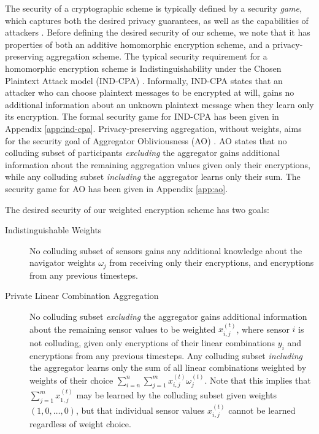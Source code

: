 \documentclass[twocolumn]{autart}
\theoremstyle{definition}
\begin{document}
The security of a cryptographic scheme is typically defined by a security \textit{game}, which captures both the desired privacy guarantees, as well as the capabilities of attackers \cite{katzIntroductionModernCryptography2008}. Before defining the desired security of our scheme, we note that it has properties of both an additive homomorphic encryption scheme, and a privacy-preserving aggregation scheme. The typical security requirement for a homomorphic encryption scheme is Indistinguishability under the Chosen Plaintext Attack model (IND-CPA) \cite{}. Informally, IND-CPA states that an attacker who can choose plaintext messages to be encrypted at will, gains no additional information about an unknown plaintext message when they learn only its encryption. The formal security game for IND-CPA has been given in Appendix \ref{app:ind-cpa}. Privacy-preserving aggregation, without weights, aims for the security goal of Aggregator Obliviousness (AO) \cite{}. AO states that no colluding subset of participants \textit{excluding} the aggregator gains additional information about the remaining aggregation values given only their encryptions, while any colluding subset \textit{including} the aggregator learns only their sum. The security game for AO has been given in Appendix \ref{app:ao}.

The desired security of our weighted encryption scheme has two goals:

\begin{description}
    \item[Indistinguishable Weights] No colluding subset of sensors gains any additional knowledge about the navigator weights $\omega_j$ from receiving only their encryptions, and encryptions from any previous timesteps.
    \item[Private Linear Combination Aggregation] No colluding subset \textit{excluding} the aggregator gains additional information about the remaining sensor values to be weighted $x^{(t)}_{i,j}$, where sensor $i$ is not colluding, given only encryptions of their linear combinations $y_i$ and encryptions from any previous timesteps. Any colluding subset \textit{including} the aggregator learns only the sum of all linear combinations weighted by weights of their choice $\sum^n_{i=n}\sum^m_{j=1}x^{(t)}_{i,j}\omega^{(t)}_j$. Note that this implies that $\sum^m_{j=1}x^{(t)}_{1,j}$ may be learned by the colluding subset given weights $(1,0,\dots,0)$, but that individual sensor values $x^{(t)}_{i,j}$ cannot be learned regardless of weight choice.
\end{description}
\end{document}
